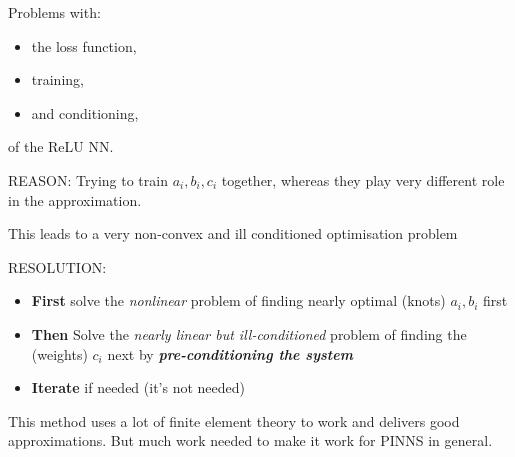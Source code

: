 \documentclass{beamer}
\begin{document}
\begin{frame}


{\Large {Problems  with:}}

\vspace{0.2in}

\begin{itemize}

 \item {\Large { {\color{red} the loss function, }}}

\item {\Large { {\color{red} training,}}} 

\item {\Large { {\color{red}and conditioning,} }}

\end{itemize}

\vspace{0.2in}

{\Large {of the ReLU NN.}}

\end{frame}

\begin{frame}

{\color{red}  REASON:} Trying to train $a_i,b_i,c_i$ together, whereas they play very different role in the approximation. 

\vspace{0.1in}

This leads to a {\color{red} very non-convex and ill conditioned optimisation problem}

\vspace{0.2in}

{\color{red}  RESOLUTION:} 

\begin{itemize}

\item {\bf First} solve the {\em nonlinear} problem of finding nearly optimal (knots) $a_i,b_i$ first 
\item {\bf Then} Solve the {\em nearly linear but ill-conditioned} problem of finding the (weights) $c_i$ next by {\em {\color{red} {\bf pre-conditioning the system}}}
\item {\bf Iterate} if needed (it's not needed)


\end{itemize}


This method uses a lot of finite element theory to work and delivers good approximations. But much work needed to make it work for PINNS in general.

\end{frame}
\end{document}
